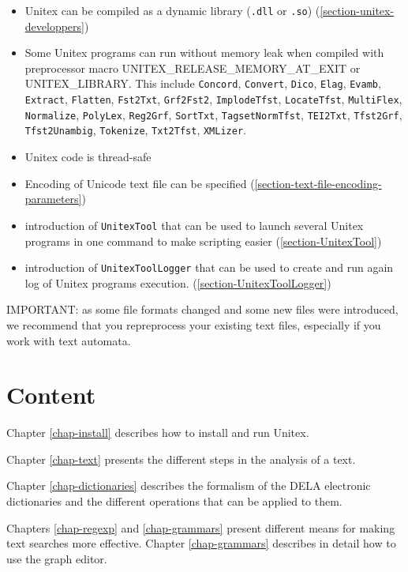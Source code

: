 \begin{itemize}
  \item Unitex can be compiled as a dynamic library (\verb$.dll$ or \verb$.so$)
  (\ref{section-unitex-developpers})
  \item Some Unitex programs can run without memory leak when compiled with preprocessor
  macro UNITEX\_RELEASE\_MEMORY\_AT\_EXIT or UNITEX\_LIBRARY.
  This include \verb$Concord$, \verb$Convert$, \verb$Dico$, \verb$Elag$, \verb$Evamb$, \verb$Extract$, \verb$Flatten$, \verb$Fst2Txt$, \verb$Grf2Fst2$, \verb$ImplodeTfst$, \verb$LocateTfst$, \verb$MultiFlex$, \verb$Normalize$, \verb$PolyLex$, \verb$Reg2Grf$, \verb$SortTxt$, \verb$TagsetNormTfst$, \verb$TEI2Txt$, \verb$Tfst2Grf$, \verb$Tfst2Unambig$, \verb$Tokenize$, \verb$Txt2Tfst$, \verb$XMLizer$.
  \item Unitex code is thread-safe
  \item Encoding of Unicode text file can be specified (\ref{section-text-file-encoding-parameters})
  \item introduction of \verb$UnitexTool$ that can be used to launch several
  Unitex programs in one command to make scripting easier
  (\ref{section-UnitexTool})
  \item introduction of \verb$UnitexToolLogger$ that can be used to create and
  run again log of Unitex programs execution.
  (\ref{section-UnitexToolLogger})
\end{itemize}

\bigskip
\noindent IMPORTANT: as some file formats changed and some new files were introduced, we recommend that you
repreprocess your existing text files, especially if you work with text
automata.

\section*{Content}
\noindent Chapter \ref{chap-install} describes how to install and run
Unitex.

\bigskip \noindent Chapter \ref{chap-text} presents the different steps in the
analysis of  a text.

\bigskip \noindent Chapter \ref{chap-dictionaries} describes the formalism of
the DELA electronic dictionaries and the different operations that can be applied to them.

\bigskip \noindent Chapters \ref{chap-regexp} and \ref{chap-grammars}
present different means for making text searches more effective. 
Chapter \ref{chap-grammars} describes in detail how to use the graph
editor.

